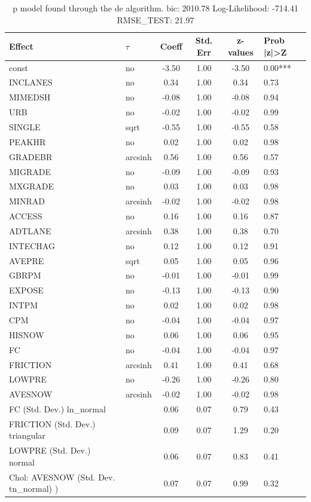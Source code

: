 \begin{table}
	\caption{p model found through the de algorithm. bic: 2010.78 Log-Likelihood: -714.41 RMSE_TEST: 21.97}
	\begin{center}
		\begin{tabular}{|l|l|c|c|c|l|}
			\hline
			Effect & $\tau$ & Coeff & Std. Err & z-values & Prob |z|>Z \\
			\hline
			const & no & -3.50 & 1.00 & -3.50 & 0.00*** \\
			\hline
			INCLANES & no & 0.34 & 1.00 & 0.34 & 0.73 \\
			\hline
			MIMEDSH & no & -0.08 & 1.00 & -0.08 & 0.94 \\
			\hline
			URB & no & -0.02 & 1.00 & -0.02 & 0.99 \\
			\hline
			SINGLE & sqrt & -0.55 & 1.00 & -0.55 & 0.58 \\
			\hline
			PEAKHR & no & 0.02 & 1.00 & 0.02 & 0.98 \\
			\hline
			GRADEBR & arcsinh & 0.56 & 1.00 & 0.56 & 0.57 \\
			\hline
			MIGRADE & no & -0.09 & 1.00 & -0.09 & 0.93 \\
			\hline
			MXGRADE & no & 0.03 & 1.00 & 0.03 & 0.98 \\
			\hline
			MINRAD & arcsinh & -0.02 & 1.00 & -0.02 & 0.98 \\
			\hline
			ACCESS & no & 0.16 & 1.00 & 0.16 & 0.87 \\
			\hline
			ADTLANE & arcsinh & 0.38 & 1.00 & 0.38 & 0.70 \\
			\hline
			INTECHAG & no & 0.12 & 1.00 & 0.12 & 0.91 \\
			\hline
			AVEPRE & sqrt & 0.05 & 1.00 & 0.05 & 0.96 \\
			\hline
			GBRPM & no & -0.01 & 1.00 & -0.01 & 0.99 \\
			\hline
			EXPOSE & no & -0.13 & 1.00 & -0.13 & 0.90 \\
			\hline
			INTPM & no & 0.02 & 1.00 & 0.02 & 0.98 \\
			\hline
			CPM & no & -0.04 & 1.00 & -0.04 & 0.97 \\
			\hline
			HISNOW & no & 0.06 & 1.00 & 0.06 & 0.95 \\
			\hline
			FC & no & -0.04 & 1.00 & -0.04 & 0.97 \\
			\hline
			FRICTION & arcsinh & 0.41 & 1.00 & 0.41 & 0.68 \\
			\hline
			LOWPRE & no & -0.26 & 1.00 & -0.26 & 0.80 \\
			\hline
			AVESNOW & arcsinh & -0.02 & 1.00 & -0.02 & 0.98 \\
			\hline
			FC (Std. Dev.) ln_normal &  & 0.06 & 0.07 & 0.79 & 0.43 \\
			\hline
			FRICTION (Std. Dev.) triangular &  & 0.09 & 0.07 & 1.29 & 0.20 \\
			\hline
			LOWPRE (Std. Dev.) normal &  & 0.06 & 0.07 & 0.83 & 0.41 \\
			\hline
			 Chol: AVESNOW (Std. Dev. tn_normal) ) &  & 0.07 & 0.07 & 0.99 & 0.32 \\
			\hline
		\end{tabular}
	\end{center}
\end{table}